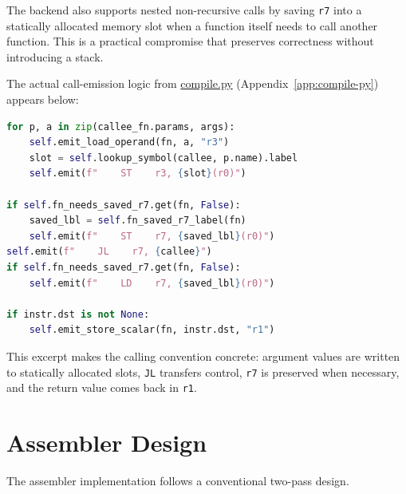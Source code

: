 \documentclass[12pt]{report}
\begin{document}
The backend also supports nested non-recursive calls by saving \texttt{r7} into
a statically allocated memory slot when a function itself needs to call another
function. This is a practical compromise that preserves correctness without
introducing a stack.

The actual call-emission logic from
\href{https://github.com/shorewind/Custom-ISA-Toolchain/blob/main/compile.py}{compile.py}
(Appendix~\ref{app:compile-py}) appears below:

\begin{center}
\begin{minipage}{0.82\textwidth}
\begin{lstlisting}[language=Python]
for p, a in zip(callee_fn.params, args):
    self.emit_load_operand(fn, a, "r3")
    slot = self.lookup_symbol(callee, p.name).label
    self.emit(f"    ST    r3, {slot}(r0)")

if self.fn_needs_saved_r7.get(fn, False):
    saved_lbl = self.fn_saved_r7_label(fn)
    self.emit(f"    ST    r7, {saved_lbl}(r0)")
self.emit(f"    JL    r7, {callee}")
if self.fn_needs_saved_r7.get(fn, False):
    self.emit(f"    LD    r7, {saved_lbl}(r0)")

if instr.dst is not None:
    self.emit_store_scalar(fn, instr.dst, "r1")
\end{lstlisting}
\end{minipage}
\end{center}

This excerpt makes the calling convention concrete: argument values are written
to statically allocated slots, \texttt{JL} transfers control, \texttt{r7} is
preserved when necessary, and the return value comes back in \texttt{r1}.

\section{Assembler Design}

The assembler implementation follows a conventional two-pass design.
\end{document}
